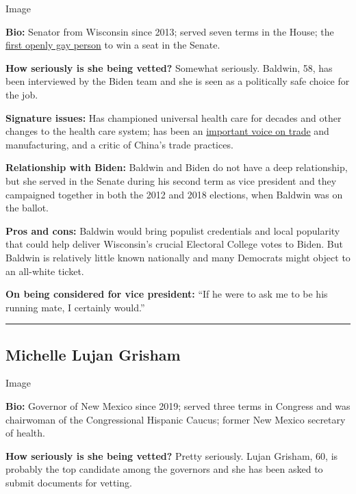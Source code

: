 Image

\textbf{Bio:} Senator from Wisconsin since 2013; served seven terms in
the House; the
\href{https://www.nytimes3xbfgragh.onion/2012/11/04/fashion/tammy-baldwin-on-the-edge-of-making-history.html}{first
openly gay person} to win a seat in the Senate.

\textbf{How seriously is she being vetted?} Somewhat seriously. Baldwin,
58, has been interviewed by the Biden team and she is seen as a
politically safe choice for the job.

\textbf{Signature issues:} Has championed universal health care for
decades and other changes to the health care system; has been an
\href{https://www.nytimes3xbfgragh.onion/2017/08/02/us/politics/senate-democrats-seek-to-outdo-trump-on-trade.html}{important
voice on trade} and manufacturing, and a critic of China's trade
practices.

\textbf{Relationship with Biden:} Baldwin and Biden do not have a deep
relationship, but she served in the Senate during his second term as
vice president and they campaigned together in both the 2012 and 2018
elections, when Baldwin was on the ballot.

\textbf{Pros and cons:} Baldwin would bring populist credentials and
local popularity that could help deliver Wisconsin's crucial Electoral
College votes to Biden. But Baldwin is relatively little known
nationally and many Democrats might object to an all-white ticket.

\textbf{On being considered for vice president:} ``If he were to ask me
to be his running mate, I certainly would.''

\begin{center}\rule{0.5\linewidth}{\linethickness}\end{center}

\hypertarget{michelle-lujan-grisham}{%
\subsection{Michelle Lujan Grisham}\label{michelle-lujan-grisham}}

Image

\textbf{Bio:} Governor of New Mexico since 2019; served three terms in
Congress and was chairwoman of the Congressional Hispanic Caucus; former
New Mexico secretary of health.

\textbf{How seriously is she being vetted?} Pretty seriously. Lujan
Grisham, 60, is probably the top candidate among the governors and she
has been asked to submit documents for vetting.

